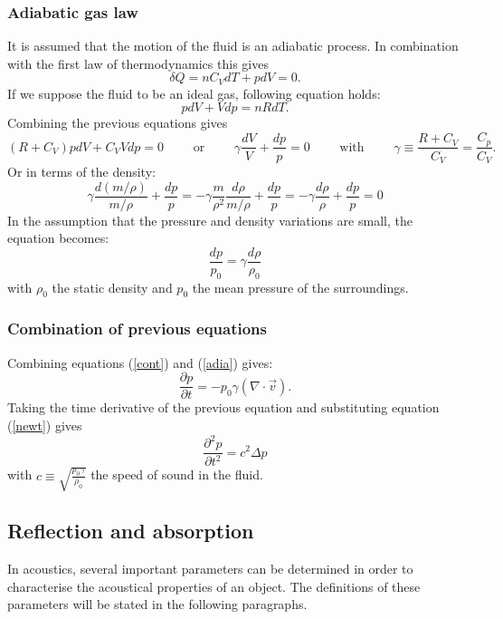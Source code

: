 \subsubsection*{Adiabatic gas law}
It is assumed that the motion of the fluid is an adiabatic process. In combination with the first law of thermodynamics this gives
\[
\delta Q = n C_V dT + p dV = 0.
\]
If we suppose the fluid to be an ideal gas, following equation holds:
\[
p dV + V dp = n R dT.
\]
Combining the previous equations gives
\[
(R+ C_V ) p dV + C_V V dp = 0  \qquad \textrm{ or } \qquad \gamma \frac{dV}{V} + \frac{dp}{p} = 0 \qquad \textrm{ with } \qquad \gamma \equiv \frac{R+C_V}{C_V} = \frac{C_p}{C_V}.
\]
Or in terms of the density:
\[
\gamma \frac{d(m/\rho)}{m/ \rho} + \frac{dp}{p} = -\gamma \frac{m}{\rho^2} \frac{d\rho}{m/ \rho} + \frac{dp}{p} =- \gamma \frac{d\rho}{\rho} + \frac{dp}{p} =0
\]
In the assumption that the pressure and density variations are small, the equation becomes:
\begin{equation}
\frac{dp}{p_0} =\gamma \frac{d\rho}{\rho_0}
\label{adia}
\end{equation}
with $\rho_0$ the static density and $p_0$ the mean pressure of the surroundings.





\subsubsection*{Combination of previous equations}
Combining equations (\ref{cont}) and (\ref{adia}) gives:
\[
\frac{\partial p}{\partial t} = - p_0 \gamma \left(\nabla \cdot \vec{v}\right).
\]
Taking the time derivative of the previous equation and substituting equation (\ref{newt}) gives
\[
\frac{\partial^2 p}{\partial t^2} =  c^2 \Delta p
\]
with $c\equiv \sqrt{\frac{p_0 \gamma}{\rho_0}}$ the speed of sound in the fluid.







\subsection{Reflection and absorption}
In acoustics, several important parameters can be determined in order to characterise the acoustical properties of an object. The  definitions of these parameters will be stated in the following paragraphs.


